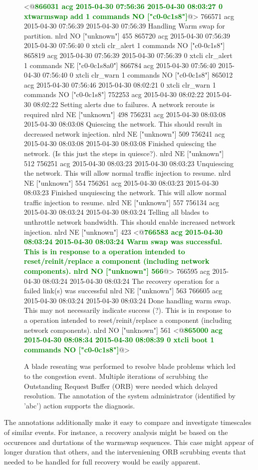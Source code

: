 \begin{figure*}
\begin{annol}
<@\textbf{\textcolor{green}{866031	acg	2015-04-30 07:56:36	2015-04-30 08:03:27	0	xtwarmswap add	1	commands	NO	["c0-0c1s8"]}}@>
766571	acg	2015-04-30 07:56:39	2015-04-30 07:56:39		Handling Warm swap for partition.	nlrd	NO	["unknown"]	455
865720	acg	2015-04-30 07:56:39	2015-04-30 07:56:40	0	xtcli clr_alert	1	commands	NO	["c0-0c1s8"]
865819	acg	2015-04-30 07:56:39	2015-04-30 07:56:39	0	xtcli clr_alert	1	commands	NE	["c0-0c1s8a0"]
866784	acg	2015-04-30 07:56:40	2015-04-30 07:56:40	0	xtcli clr_warn	1	commands	NO	["c0-0c1s8"]
865012	acg	2015-04-30 07:56:46	2015-04-30 08:02:21	0	xtcli clr_warn	1	commands	NO	["c0-0c1s8"]
752253	acg	2015-04-30 08:02:22	2015-04-30 08:02:22		Setting alerts due to failures. A network reroute is required	nlrd	NE	["unknown"]	498
756231	acg	2015-04-30 08:03:08	2015-04-30 08:03:08		Quiescing the network. This should result in decreased network injection.	nlrd	NE	["unknown"]	509
756241	acg	2015-04-30 08:03:08	2015-04-30 08:03:08		Finished quiescing the network. (Is this just the steps in quiesce?).	nlrd	NE	["unknown"]	512
756251	acg	2015-04-30 08:03:23	2015-04-30 08:03:23		Unquiescing the network. This will allow normal traffic injection to resume.	nlrd	NE	["unknown"]	554
756261	acg	2015-04-30 08:03:23	2015-04-30 08:03:23		Finished unquiescing the network. This will allow normal traffic injection to resume.	nlrd	NE	["unknown"]	557
756134	acg	2015-04-30 08:03:24	2015-04-30 08:03:24		Telling all blades to unthrottle network bandwidth. This should enable increased network injection.	nlrd	NE	["unknown"]	423
<@\textbf{\textcolor{green}{766583	acg	2015-04-30 08:03:24	2015-04-30 08:03:24		Warm swap was successful. This is in response to a operation intended to reset/reinit/replace a component (including network components).	nlrd	NO	["unknown"]	566}}@>
766595	acg	2015-04-30 08:03:24	2015-04-30 08:03:24		The recovery operation for a failed link(s) was successful	nlrd	NE	["unknown"]	563
766605	acg	2015-04-30 08:03:24	2015-04-30 08:03:24		Done handling warm swap. This may not necessarily indicate success (?). This is in response to a operation intended to reset/reinit/replace a component (including network components).		nlrd	NO	["unknown"]	561
<@\textbf{\textcolor{green}{865000	acg	2015-04-30 08:08:34	2015-04-30 08:08:39	0	xtcli boot	1	commands	NO	["c0-0c1s8"]}}@>
\end{annol}
\caption{A blade reseating was performed to resolve blade problems which led to the congestion event.
Multiple iterations of scrubbing the Outstanding Request Buffer (ORB) were needed which
delayed resolution. The annotation of the system administrator (identified by 'abc') action supports the diagnosis.
}
\label{f:congestresolve}
\end{figure*}


The annotations additionally make it easy to compare and investigate timescales of similar events. For instance,
a recovery analysis might be based on the occurences and durtations of the warmswap sequences. This case
might appear of longer duration that others, and the interveniening ORB scrubbing events that
needed to be handled for full recovery would be easily apparent.

